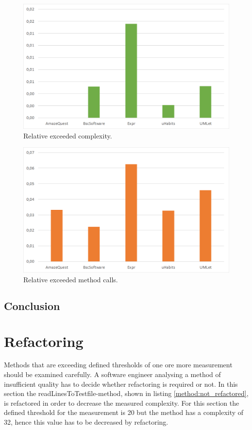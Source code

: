 \documentclass[conference]{IEEEtran}
\newcommand{\lref}[1]{listing \ref{#1}}%
\begin{document}
\begin{figure}
	\includegraphics[width=\columnwidth]{img/rel_exceeded_complexity.png}
\caption{Relative exceeded complexity.}
\label{fig:exceed_complexity}
\end{figure}



\begin{figure}
	\includegraphics[width=\columnwidth]{img/rel_exceeded_calls.png}
\caption{Relative exceeded method calls.}
\label{fig:exceed_calls}
\end{figure}

\subsection{Conclusion}

\section{Refactoring}
Methods that are exceeding defined thresholds of one ore more measurement should be examined carefully. A software engineer analysing a method of insufficient quality has to decide whether refactoring is required or not. In this section the readLinesToTestfile-method, shown in \lref{method:not_refactored}, is refactored in order to decrease the measured complexity. For this section the defined threshold for the measurement is 20 but the method has a complexity of 32, hence this value has to be decreased by refactoring.
\end{document}
